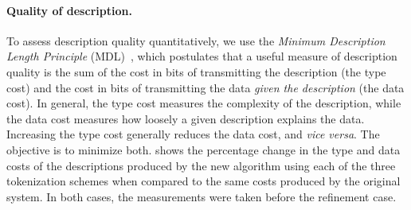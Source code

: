 \paragraph*{Quality of description.}
To assess description quality quantitatively, we use the {\em Minimum
  Description Length Principle} 
(MDL)~\cite{mdlbook}, which postulates that a useful measure of
description quality is 
the sum of the cost in bits of transmitting the description (the
type cost) and the cost in bits of transmitting the data
\textit{given the description} (the data cost).  In general, the
type cost measures the complexity of the description, while the data
cost measures how loosely a given description explains the data.
Increasing the type cost generally reduces the data cost, and
\textit{vice versa}. The objective is to minimize both.
 shows the percentage change in the type and data costs
of the descriptions produced by the new algorithm using
each of the three tokenization schemes when compared to the same costs
produced by the original \learnpads{} system.   In both cases, the
measurements were taken before the refinement case.

